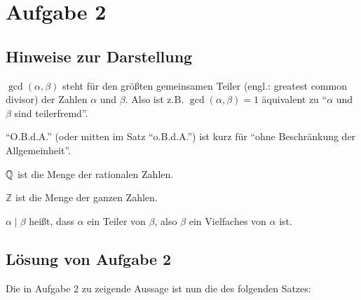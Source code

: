\section{Aufgabe 2}

\subsection*{Hinweise zur Darstellung}

$\gcd(\alpha, \beta)$ steht für den größten gemeinsamen Teiler (engl.: greatest common divisor) der Zahlen $\alpha$ 
und $\beta$. Also ist z.B. $\gcd(\alpha, \beta) = 1$ äquivalent zu "`$\alpha$ und $\beta$ sind teilerfremd"'.

"`O.B.d.A."' (oder mitten im Satz "`o.B.d.A."') ist kurz für "`ohne Beschränkung der Allgemeinheit"'.

$\mathbb{Q}$ ist die Menge der rationalen Zahlen.

$\mathbb{Z}$ ist die Menge der ganzen Zahlen.

$\alpha \mid \beta$ heißt, dass $\alpha$ ein Teiler von $\beta$, also $\beta$ ein Vielfaches von $\alpha$ ist.

\subsection*{Lösung von Aufgabe 2}

Die in Aufgabe 2 zu zeigende Aussage ist nun die des folgenden Satzes:

